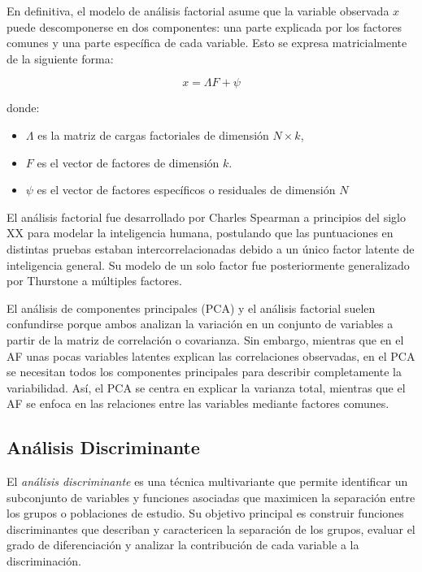 En definitiva, el modelo de análisis factorial asume que la variable observada $x$ puede descomponerse en dos componentes: una parte explicada
por los factores comunes y una parte específica de cada variable. Esto se expresa matricialmente de la siguiente forma:

\[
x=\Lambda F + \psi
\]

donde:

\begin{itemize}
    \item $\Lambda$ es la matriz de cargas factoriales de dimensión $N \times k$,
    \item $F$ es el vector de factores de dimensión $k$.
    \item $\psi$ es el vector de factores específicos o residuales de dimensión $N$
\end{itemize}

El análisis factorial fue desarrollado por Charles Spearman a principios del siglo XX para modelar la inteligencia humana, 
postulando que las puntuaciones en distintas pruebas estaban intercorrelacionadas debido a un único factor latente de inteligencia 
general. Su modelo de un solo factor fue posteriormente generalizado por Thurstone a múltiples factores. \newline

El análisis de componentes principales (PCA)  y el análisis factorial suelen confundirse porque ambos analizan 
la variación en un conjunto de variables a partir de la matriz de correlación o covarianza. Sin embargo, mientras que en el AF unas 
pocas variables latentes explican las correlaciones observadas, en el PCA se necesitan todos los componentes principales para describir 
completamente la variabilidad. Así, el PCA se centra en explicar la varianza total, mientras que el AF se enfoca en las relaciones 
entre las variables mediante factores comunes. 



\subsection{Análisis Discriminante}

El \textit{análisis discriminante} es una técnica multivariante que permite identificar un subconjunto de variables y funciones
asociadas que maximicen la separación entre los grupos o poblaciones de estudio. Su objetivo principal es construir funciones
discriminantes que describan y caractericen la separación de los grupos, evaluar el grado de diferenciación y analizar la contribución
de cada variable a la discriminación. \newline

